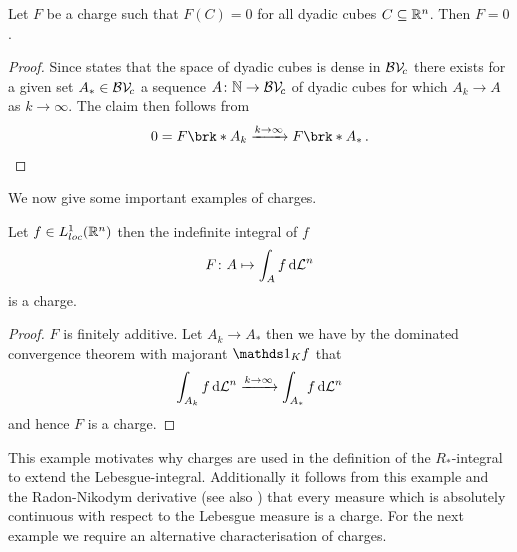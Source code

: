 \newpage
\begin{lemma}\label{le:DensityCubes}
Let $F$ be a charge such that $F(C)=0$ for all dyadic cubes $C\subseteq\mathbb{R}^n$. Then $F=0$.
\end{lemma}
\begin{proof}
Since \cite[Corollary 1.10.4]{Pfe2001} states that the space of dyadic cubes is dense in $\mathcal{BV\!}_c$ there exists for a given set $A_*\in \mathcal{BV\!}_c$ a sequence $A\colon\mathbb{N}\to\mathcal{BV\!}_c$ of dyadic cubes for which $A_k\to A$ as $k\to\infty$. The claim then follows from
\begin{align*}
	0=F\brk*{A_k}\xrightarrow{k\to\infty}F\brk*{A_*}\,.
\end{align*}
\end{proof}

\noindent We now give some important examples of charges.

\begin{claim}
Let $f\in L^1_{loc}(\mathbb{R}^n)$ then the indefinite integral of $f$
\begin{align*}
	F\colon A\mapsto \int_Af\,\mathrm{d} \mathcal{L}^n
\end{align*}
is a charge.
\end{claim}
\begin{proof}
$F$ is finitely additive. Let $A_k\to A_*$ then we have by the dominated convergence theorem with majorant $\one_Kf$ that
\begin{align*}
	\int_{A_k}f\,\mathrm{d} \mathcal{L}^n\xrightarrow{k\to\infty}\int_{A_*}f\,\mathrm{d} \mathcal{L}^n
\end{align*}
and hence $F$ is a charge.
\end{proof}

\noindent This example motivates why charges are used in the definition of the $R_*$-integral to extend the Lebesgue-integral. Additionally it follows from this example and the Radon-Nikodym derivative (see also \cite[Chapter 4.2]{Coh2013}) that every measure which is absolutely continuous with respect to the Lebesgue measure is a charge. For the next example we require an alternative characterisation of charges.

